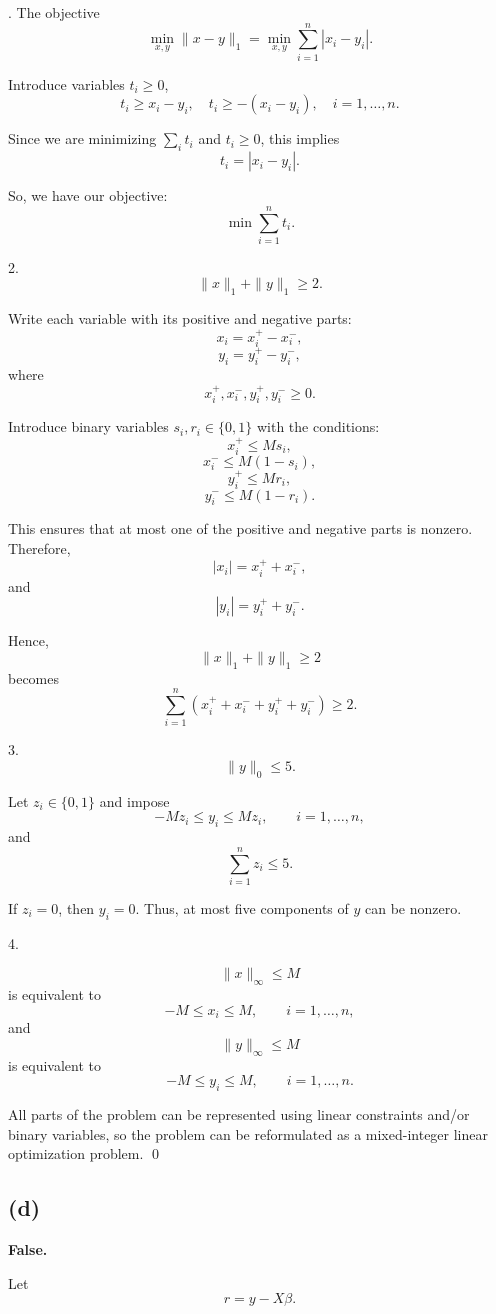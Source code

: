 \documentclass{article}
\begin{document}
. The objective
\[
\min_{x,y} \|x-y\|_1
=
\min_{x,y} \sum_{i=1}^n |x_i-y_i|.
\]

Introduce variables $t_i \geq 0$, 
\[
\boxed{t_i \geq x_i-y_i,\quad t_i \geq -(x_i-y_i),\quad i=1,\ldots,n.}
\]

Since we are minimizing $\sum_i t_i$ and $t_i \geq 0$, this implies
\[
t_i=|x_i-y_i|.
\]

So, we have our objective: 
\[
\min \sum_{i=1}^n t_i.
\]

2. 
\[
\|x\|_1+\|y\|_1\geq 2.
\]

Write each variable with its positive and negative
parts:
\[
x_i=x_i^+-x_i^-,
\]
\[
y_i=y_i^+-y_i^-,
\]
where
\[
x_i^+,x_i^-,y_i^+,y_i^- \geq 0.
\]

Introduce binary variables $s_i,r_i\in\{0,1\}$ with the conditions:
\[
x_i^+ \leq Ms_i,
\]
\[
x_i^- \leq M(1-s_i),
\]
\[
y_i^+ \leq Mr_i,
\]
\[
y_i^- \leq M(1-r_i).
\]

This ensures that at most one of the positive and negative
parts is nonzero. Therefore,
\[
|x_i|=x_i^++x_i^-,
\]
and
\[
|y_i|=y_i^++y_i^-.
\]

Hence,
\[
\|x\|_1+\|y\|_1\geq 2
\]
becomes
\[
\boxed{
\sum_{i=1}^n
\left(
x_i^+ + x_i^- + y_i^+ + y_i^-
\right)
\geq 2.}
\]


3. 
\[
\|y\|_0\leq 5.
\]

Let $z_i\in\{0,1\}$ and impose
\[
\boxed{
-Mz_i\leq y_i\leq Mz_i,
\qquad i=1,\ldots,n,}
\]
and
\[
\boxed{
\sum_{i=1}^n z_i\leq 5.}
\]

If $z_i=0$, then $y_i=0$. Thus, at most five components of $y$
can be nonzero.

\vspace{3mm}

4. 


\[
\|x\|_\infty\leq M
\]
is equivalent to
\[
\boxed{
-M\leq x_i\leq M,
\qquad i=1,\ldots,n,}
\]
and
\[
\|y\|_\infty\leq M
\]
is equivalent to
\[
\boxed{
-M\leq y_i\leq M,
\qquad i=1,\ldots,n.}
\]

All parts of the problem can be represented using linear
constraints and/or binary variables, so the problem can be reformulated
as a mixed-integer linear optimization problem. \qed



\subsection*{(d)}
\textbf{False.}

Let
\[
r = y-X\beta.
\]
\end{document}
